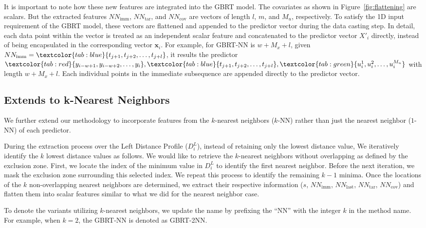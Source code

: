 It is important to note how these new features are integrated into the GBRT model.
The covariates as shown in Figure~\ref{fig:flattening} are scalars.
But the extracted features $NN_{\text{imm}}$, $NN_{\text{tar}}$, and $NN_{\text{cov}}$ are vectors of length $l$, $m$, and $M_u$, respectively.
%
To satisfy the 1D input requirement of the GBRT model, these vectors are flattened and appended to the predictor vector during the data casting step. 
In detail, each data point within the vector is treated as an independent scalar feature and concatenated to the predictor vector $X'_i$ directly, instead of being encapsulated in the corresponding vector $\textbf{x}_i$. 
For example, for \textsf{GBRT-NN} is $w + M_x + l$, given $NN_{\text{imm}} = \textcolor{tab:blue}{t_{j+1}, t_{j+2}, \dots, t_{j+l}}$, it results the predictor  
$\textcolor{tab:red}{y_{i-w+1}, y_{i-w+2}, \dots, y_i}, \textcolor{tab:blue}{t_{j+1}, t_{j+2}, \dots, t_{j+l}}, \textcolor{tab:green}{u_i^1, u_i^2, \dots, u_i^{M_u}}$
with length $w + M_x + l$.
Each individual points in the immediate subsequence are appended directly to the predictor vector.

\subsection{Extends to k-Nearest Neighbors} %
We further extend our methodology to incorporate features from the $k$-nearest neighbors ($k$-NN) rather than just the nearest neighbor ($1$-NN) of each predictor.

During the extraction process over the Left Distance Profile ($D^L_i$), instead of retaining only the lowest distance value, 
We iteratively identify the $k$ lowest distance values as follows.
%
We would like to retrieve the $k$-nearest neighbors without overlapping as defined by the exclusion zone.
%
First, we locate the index of the minimum value in $D^L_i$ to identify the first nearest neighbor. 
Before the next iteration, we mask the exclusion zone surrounding this selected index.
We repeat this process to identify the remaining $k-1$ minima.
%
Once the locations of the $k$ non-overlapping nearest neighbors are determined, we extract their respective information ($s$, $NN_{\text{imm}}$, $NN_{\text{last}}$, $NN_{\text{tar}}$, $NN_{\text{cov}}$) and flatten them into scalar features similar to what we did for the nearest neighbor case. 

To denote the variants utilizing $k$-nearest neighbors, we update the name by prefixing the ``NN'' with the integer $k$ in the method name. 
For example, when $k=2$, the \textsf{GBRT-NN} is denoted as \textsf{GBRT-2NN}.
